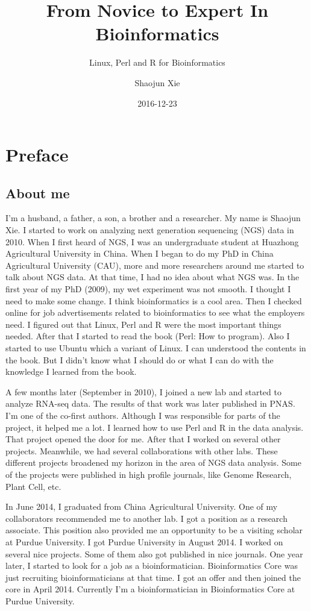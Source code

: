 \documentclass[]{book}
\title{From Novice to Expert In Bioinformatics}
\subtitle{Linux, Perl and R for Bioinformatics}
\author{Shaojun Xie}
\date{2016-12-23}
\begin{document}
\maketitle

{
\setcounter{tocdepth}{1}
\tableofcontents
}
\chapter{Preface}\label{preface}

\section{About me}\label{about-me}

I'm a husband, a father, a son, a brother and a researcher. My name is
Shaojun Xie. I started to work on analyzing next generation sequencing
(NGS) data in 2010. When I first heard of NGS, I was an undergraduate
student at Huazhong Agricultural University in China. When I began to do
my PhD in China Agricultural University (CAU), more and more researchers
around me started to talk about NGS data. At that time, I had no idea
about what NGS was. In the first year of my PhD (2009), my wet
experiment was not smooth. I thought I need to make some change. I think
bioinformatics is a cool area. Then I checked online for job
advertisements related to bioinformatics to see what the employers need.
I figured out that Linux, Perl and R were the most important things
needed. After that I started to read the book (Perl: How to program).
Also I started to use Ubuntu which a variant of Linux. I can understood
the contents in the book. But I didn't know what I should do or what I
can do with the knowledge I learned from the book.

A few months later (September in 2010), I joined a new lab and started
to analyze RNA-seq data. The results of that work was later published in
PNAS. I'm one of the co-first authors. Although I was responsible for
parts of the project, it helped me a lot. I learned how to use Perl and
R in the data analysis. That project opened the door for me. After that
I worked on several other projects. Meanwhile, we had several
collaborations with other labs. These different projects broadened my
horizon in the area of NGS data analysis. Some of the projects were
published in high profile journals, like Genome Research, Plant Cell,
etc.

In June 2014, I graduated from China Agricultural University. One of my
collaborators recommended me to another lab. I got a position as a
research associate. This position also provided me an opportunity to be
a visiting scholar at Purdue University. I got Purdue University in
August 2014. I worked on several nice projects. Some of them also got
published in nice journals. One year later, I started to look for a job
as a bioinformatician. Bioinformatics Core was just recruiting
bioinformaticians at that time. I got an offer and then joined the core
in April 2014. Currently I'm a bioinformatician in Bioinformatics Core
at Purdue University.
\end{document}
